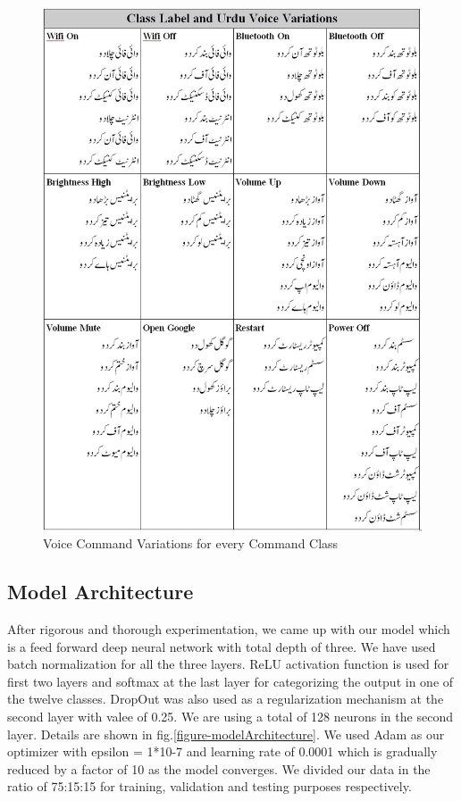 \documentclass[conference]{IEEEtran}
\begin{document}
\begin{figure}[h!]
  \includegraphics[width=\linewidth]{tableTotalVoiceCommandsVariations.jpg}
  \caption{Voice Command Variations for every Command Class}
  \label{tableTotalVoiceCommandsVariations}
\end{figure} 

\subsection{Model Architecture}
After rigorous and thorough experimentation, we came up with our model which is a feed forward deep neural network with total depth of three. We have used batch normalization for all the three layers. ReLU activation function is used for first two layers and softmax at the last layer for categorizing the output in one of the twelve classes. DropOut was also used as a regularization mechanism at the second layer with valee of 0.25. We are using a total of 128 neurons in the second layer. Details are shown in fig.\ref{figure-modelArchitecture}. We used Adam as our optimizer with epsilon = 1*10-7 and learning rate of 0.0001 which is gradually reduced by a factor of 10 as the model converges. We divided our data in the ratio of 75:15:15 for training, validation and testing purposes respectively.
\end{document}
